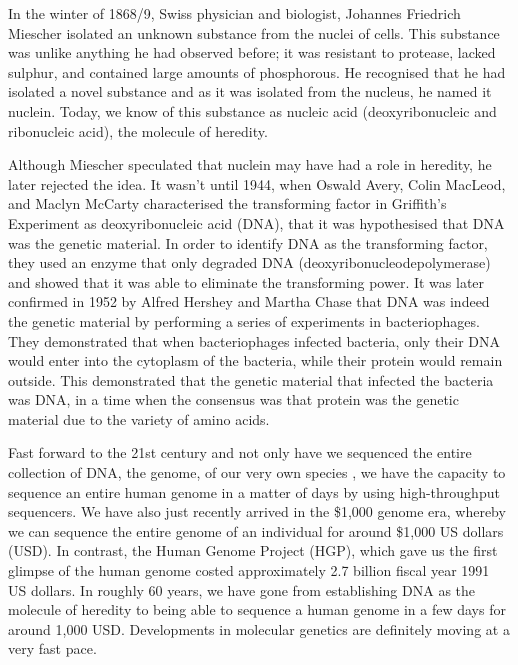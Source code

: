 In the winter of 1868/9, Swiss physician and biologist, Johannes Friedrich Miescher isolated an unknown substance from the nuclei of cells\cite{dahm2008discovering}. This substance was unlike anything he had observed before; it was resistant to protease, lacked sulphur, and contained large amounts of phosphorous. He recognised that he had isolated a novel substance and as it was isolated from the nucleus, he named it nuclein. Today, we know of this substance as nucleic acid (deoxyribonucleic and ribonucleic acid), the molecule of heredity.

Although Miescher speculated that nuclein may have had a role in heredity, he later rejected the idea. It wasn't until 1944, when Oswald Avery, Colin MacLeod, and Maclyn McCarty characterised the transforming factor in Griffith's Experiment\cite{griffith1928significance} as deoxyribonucleic acid (DNA), that it was hypothesised that DNA was the genetic material\cite{avery1944studies}. In order to identify DNA as the transforming factor, they used an enzyme that only degraded DNA (deoxyribonucleodepolymerase) and showed that it was able to eliminate the transforming power. It was later confirmed in 1952 by Alfred Hershey and Martha Chase that DNA was indeed the genetic material by performing a series of experiments in bacteriophages\cite{hershey1952independent}. They demonstrated that when bacteriophages infected bacteria, only their DNA would enter into the cytoplasm of the bacteria, while their protein would remain outside. This demonstrated that the genetic material that infected the bacteria was DNA, in a time when the consensus was that protein was the genetic material due to the variety of amino acids.

Fast forward to the 21st century and not only have we sequenced the entire collection of DNA, the genome, of our very own species \cite{venter2001sequence, lander2001initial}, we have the capacity to sequence an entire human genome in a matter of days by using high-throughput sequencers. We have also just recently arrived in the \$1,000 genome era\cite{check_hayden_2014}, whereby we can sequence the entire genome of an individual for around \$1,000 US dollars (USD). In contrast, the Human Genome Project (HGP), which gave us the first glimpse of the human genome costed approximately 2.7 billion fiscal year 1991 US dollars\cite{nhgri2010cost}. In roughly 60 years, we have gone from establishing DNA as the molecule of heredity to being able to sequence a human genome in a few days for around 1,000 USD. Developments in molecular genetics are definitely moving at a very fast pace.

